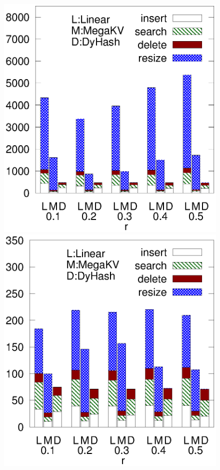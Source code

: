 \begin{figure}[htp]
\begin{minipage}{0.19\linewidth}
		\centerline{\dsreddit}
	\end{minipage}
	\begin{minipage}{0.19\linewidth}\centering
		\includegraphics[width=\linewidth]{pic/dynamic/tpch/diff_r.eps}
		\centerline{\dstpch}
	\end{minipage}
	\begin{minipage}{0.19\linewidth}\centering
		\includegraphics[width=\linewidth]{pic/dynamic/ali/diff_r.eps}

\end{minipage}
\end{figure}
